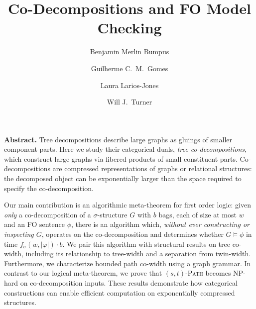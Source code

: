 \documentclass[11pt]{article}
\title{\vspace{-1cm} Co-Decompositions and FO Model Checking}
\author{Benjamin Merlin Bumpus \and Guilherme C.~M.~Gomes \and Laura Larios-Jones \and Will J.~Turner}
\date{}
\begin{document}
\maketitle

\thispagestyle{empty}

\setcounter{page}{0}

\vspace{-0.75cm}
\begin{center}
\begin{minipage}{0.9\textwidth}
\small
\textbf{Abstract.} 
Tree decompositions describe large graphs as gluings of smaller component parts. Here we study their categorical duals, \textit{tree co-decompositions}, which construct large graphs via fibered products of small constituent parts. Co-decompositions are compressed representations of graphs or relational structures: the decomposed object can be exponentially larger than the space required to specify the co-decomposition. 

Our main contribution is an algorithmic meta-theorem for first order logic: given \textit{only} a co-decomposition of a $\sigma$-structure $G$ with $b$ bags, each of size at most $w$ and an FO sentence $\phi$, there is an algorithm which, \textit{without ever constructing or inspecting $G$}, operates on the co-decomposition and determines whether $G \models \phi$ in time $f_\sigma(w,|\varphi|)\cdot b$. We pair this algorithm with structural results on tree co-width, including its relationship to tree-width and a separation from twin-width. Furthermore, we characterize bounded path co-width using a graph grammar. In contrast to our logical meta-theorem, we prove that \textsc{$(s,t)$-Path} becomes NP-hard on co-decomposition inputs. These results demonstrate how categorical constructions can enable efficient computation on exponentially compressed structures. 
\end{minipage}
\end{center}
\vspace{2cm}



\newpage 

\tableofcontents 

\pagebreak



















\appendix






\end{document}
